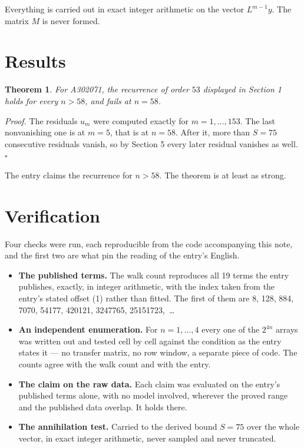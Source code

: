 \documentclass[11pt]{article}
\newtheorem{theorem}{Theorem}
\theoremstyle{definition}
\begin{document}
Everything is carried out in exact integer arithmetic on the vector $L^{m-1}y$. The matrix $M$ is never formed.

\section{Results}

\begin{theorem} For A302071, the recurrence of order $53$ displayed in Section 1 holds for every $n > 58$, and fails at $n = 58$.\end{theorem}

{\itshape Proof.} The residuals $u_m$ were computed exactly for $m = 1,\dots,153$. The last nonvanishing one is at $m = 5$, that is at $n = 58$. After it, more than $S = 75$ consecutive residuals vanish, so by Section 5 every later residual vanishes as well. $\square$

The entry claims the recurrence for $n > 58$. The theorem is at least as strong.

\section{Verification}

Four checks were run, each reproducible from the code accompanying this note, and the first two are what pin the reading of the entry's English.

\begin{itemize}

\item {\bfseries The published terms.} The walk count reproduces all 19 terms the entry publishes, exactly, in integer arithmetic, with the index taken from the entry's stated offset (1) rather than fitted. The first of them are 8, 128, 884, 7070, 54177, 420121, 3247765, 25151723,~\dots

\item {\bfseries An independent enumeration.} For $n = 1,\dots,4$ every one of the $2^{4n}$ arrays was written out and tested cell by cell against the condition as the entry states it --- no transfer matrix, no row window, a separate piece of code. The counts agree with the walk count and with the entry.

\item {\bfseries The claim on the raw data.} Each claim was evaluated on the entry's published terms alone, with no model involved, wherever the proved range and the published data overlap. It holds there.

\item {\bfseries The annihilation test.} Carried to the derived bound $S = 75$ over the whole vector, in exact integer arithmetic, never sampled and never truncated.

\end{itemize}
\end{document}
